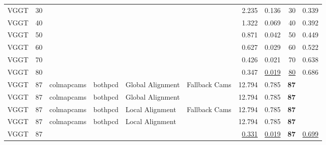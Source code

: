 \begin{table}[H]
\begin{tabular}{lrllllrrrr}
VGGT & 30 &  &  &  &  & 2.235 & 0.136 & 30 & 0.339 \\
VGGT & 40 &  &  &  &  & 1.322 & 0.069 & 40 & 0.392 \\
VGGT & 50 &  &  &  &  & 0.871 & 0.042 & 50 & 0.449 \\
VGGT & 60 &  &  &  &  & 0.627 & 0.029 & 60 & 0.522 \\
VGGT & 70 &  &  &  &  & 0.426 & 0.021 & 70 & 0.638 \\
VGGT & 80 &  &  &  &  & 0.347 & \underline{0.019} & \underline{80} & 0.686 \\
VGGT & 87 & colmapcams & bothpcd & Global Alignment & Fallback Cams & 12.794 & 0.785 & \textbf{87} &  \\
VGGT & 87 & colmapcams & bothpcd & Global Alignment &  & 12.794 & 0.785 & \textbf{87} &  \\
VGGT & 87 & colmapcams & bothpcd & Local Alignment & Fallback Cams & 12.794 & 0.785 & \textbf{87} &  \\
VGGT & 87 & colmapcams & bothpcd & Local Alignment &  & 12.794 & 0.785 & \textbf{87} &  \\
VGGT & 87 &  &  &  &  & \underline{0.331} & \underline{0.019} & \textbf{87} & \underline{0.699} \\
\bottomrule
\end{tabular}
\end{table}
